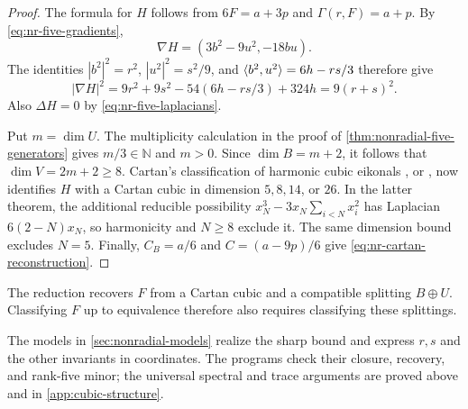 \begin{proof}
The formula for $H$ follows from $6F=a+3p$ and
$\Gamma(r,F)=a+p$. By \eqref{eq:nr-five-gradients},
\[
 \nabla H=(3b^2-9u^2,-18bu).
\]
The identities $|b^2|^2=r^2$, $|u^2|^2=s^2/9$, and
$\langle b^2,u^2\rangle=6h-rs/3$ therefore give
\[
 |\nabla H|^2
 =9r^2+9s^2-54(6h-rs/3)+324h=9(r+s)^2.
\]
Also $\Delta H=0$ by \eqref{eq:nr-five-laplacians}.

Put $m=\dim U$. The multiplicity calculation in the proof of
\cref{thm:nonradial-five-generators} gives $m/3\in\mathbb N$
and $m>0$. Since $\dim B=m+2$, it follows that
$\dim V=2m+2\ge8$.
Cartan's classification of harmonic cubic eikonals
\cite{Cartan39}, or \cite[Theorem~1.1]{TkachevCartan10},
now identifies $H$ with a Cartan cubic in dimension $5,8,14$, or
$26$. In the latter theorem, the additional reducible possibility
$x_N^3-3x_N\sum_{i<N}x_i^2$ has Laplacian $6(2-N)x_N$,
so harmonicity and $N\ge8$ exclude it. The same dimension bound
excludes $N=5$. Finally, $C_B=a/6$ and $C=(a-9p)/6$ give
\eqref{eq:nr-cartan-reconstruction}.
\end{proof}

The reduction recovers $F$ from a Cartan cubic and a compatible
splitting $B\oplus U$. Classifying $F$ up to equivalence therefore
also requires classifying these splittings.

The models in \cref{sec:nonradial-models} realize the sharp bound
and express \(r,s\) and the other invariants in coordinates.
The programs check their closure, recovery, and rank-five minor;
the universal spectral and trace arguments are proved above and in
\cref{app:cubic-structure}.
